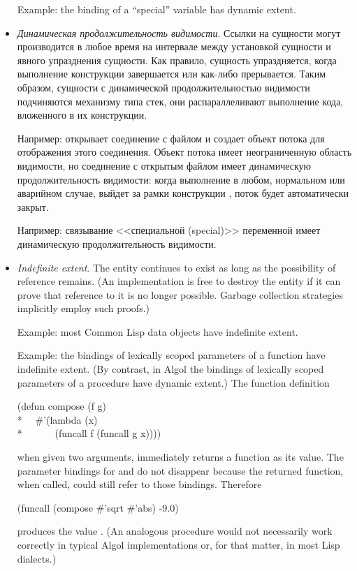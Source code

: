 \begin{itemize}
Example: the binding of a ``special'' variable has dynamic extent.

\item
{\it Динамическая продолжительность видимости}. Ссылки на сущности могут
производится в любое время на интервале между установкой сущности и явного
упразднения сущности. Как правило, сущность упраздняется, когда выполнение конструкции
завершается или как-либо прерывается. Таким образом, сущности с динамической
продолжительностью видимости подчиняются механизму типа стек, они распараллеливают
выполнение кода, вложенного в их конструкции.

Например:  открывает соединение с файлом и создает объект
потока для отображения этого соединения. Объект потока имеет неограниченную область
видимости, но соединение с открытым файлом имеет динамическую продолжительность
видимости: когда выполнение в любом, нормальном или аварийном случае, выйдет за
рамки конструкции , поток будет автоматически закрыт.

Например: связывание <<специальной (special)>> переменной имеет динамическую
продолжительность видимости.

\item
{\it Indefinite extent}.  The entity continues to exist as long as the
possibility of reference remains.  (An implementation is free to
destroy the entity if it can prove that reference to it is no longer possible.
Garbage collection strategies implicitly employ such proofs.)

Example: most Common Lisp data objects have indefinite extent.

Example: the bindings of lexically scoped parameters of a function have
indefinite extent.  (By contrast, in Algol the bindings of lexically scoped
parameters of a procedure have dynamic extent.)
The function definition
\begin{lisp}
(defun compose (f g) \\*
~~\#'(lambda (x) \\*
~~~~~~(funcall f (funcall g x))))
\end{lisp}
when given two arguments, immediately returns a function as its value.
The parameter bindings for  and  do not disappear because the
returned function, when called, could still refer to those bindings.
Therefore
\begin{lisp}
(funcall (compose \#'sqrt \#'abs) -9.0)
\end{lisp}
produces the value .  (An analogous procedure would not necessarily work
correctly in typical Algol implementations or, for that matter,
in most Lisp dialects.)


\end{itemize}
